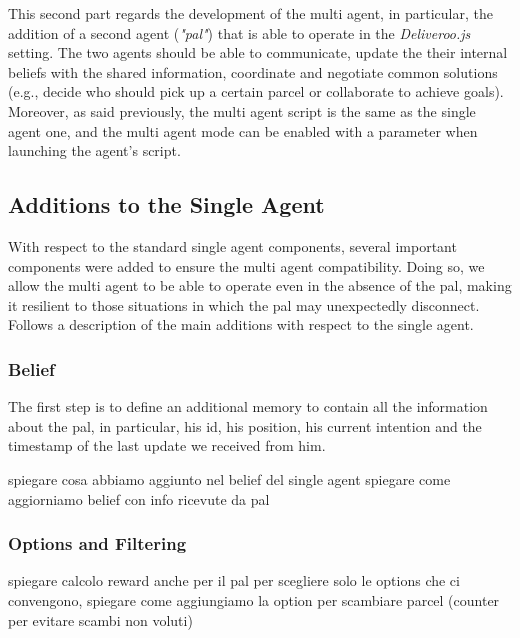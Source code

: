     This second part regards the development of the multi agent, in particular, the addition of a second agent (\textit{"pal"}) that is able to operate in the \textit{Deliveroo.js} setting. The two agents should be able to communicate, update the their internal beliefs with the shared information, coordinate and negotiate common solutions (e.g., decide who should pick up a certain parcel or collaborate to achieve goals).
    \medskip\\    
    Moreover, as said previously, the multi agent script is the same as the single agent one, and the multi agent mode can be enabled with a parameter when launching the agent's script.

    \subsection{Additions to the Single Agent}
        With respect to the standard single agent components, several important components were added to ensure the multi agent compatibility. Doing so, we allow the multi agent to be able to operate even in the absence of the pal, making it resilient to those situations in which the pal may unexpectedly disconnect.
        \medskip\\
        Follows a description of the main additions with respect to the single agent.

        \subsubsection{Belief}
            The first step is to define an additional memory to contain all the information about the pal, in particular, his id, his position, his current intention and the timestamp of the last update we received from him.

            spiegare cosa abbiamo aggiunto nel belief del single agent
            spiegare come aggiorniamo belief con info ricevute da pal

        \subsubsection{Options and Filtering}
            spiegare calcolo reward anche per il pal per scegliere solo le options che ci convengono, spiegare come aggiungiamo la option per scambiare parcel (counter per evitare scambi non voluti)

